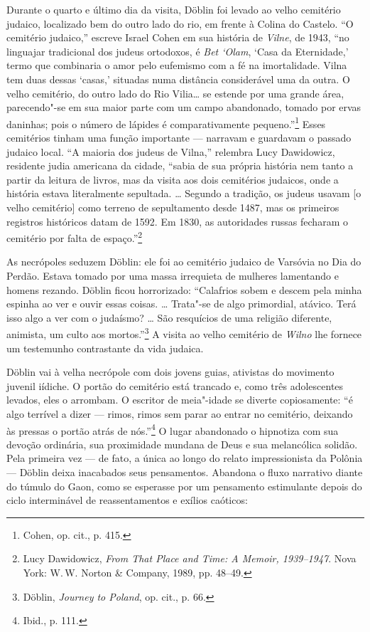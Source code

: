 Durante o quarto e último dia da visita, Döblin foi levado ao velho
cemitério judaico, localizado bem do outro lado do rio, em frente à
Colina do Castelo. ``O cemitério judaico,'' escreve Israel Cohen em sua
história de \textit{Vilne}, de 1943, ``no linguajar tradicional dos judeus
ortodoxos, é \textit{Bet `Olam}, `Casa da Eternidade,' termo que
combinaria o amor pelo eufemismo com a fé na imortalidade. Vilna tem
duas dessas `casas,' situadas numa distância considerável uma da outra.
O velho cemitério, do outro lado do Rio Vilia\ldots{} se estende por uma
grande área, parecendo"-se em sua maior parte com um campo abandonado,
tomado por ervas daninhas; pois o número de lápides é comparativamente
pequeno.''\footnote{Cohen, op. cit., p. 415.} Esses cemitérios tinham
uma função importante --- narravam e guardavam o passado judaico local.
``A maioria dos judeus de Vilna,'' relembra Lucy Dawidowicz, residente
judia americana da cidade, ``sabia de sua própria história nem tanto a
partir da leitura de livros, mas da visita aos dois cemitérios judaicos,
onde a história estava literalmente sepultada. \ldots{} Segundo a
tradição, os judeus usavam {[}o velho cemitério{]} como terreno de
sepultamento desde 1487, mas os primeiros registros históricos datam de
1592. Em 1830, as autoridades russas fecharam o cemitério por falta de
espaço.''\footnote{Lucy Dawidowicz, \textit{From That Place and Time: A Memoir, 1939--1947}. Nova York: W.\,W. Norton \& Company, 1989, pp. 48--49.}

As necrópoles seduzem Döblin: ele foi ao cemitério judaico de Varsóvia
no Dia do Perdão. Estava tomado por uma massa irrequieta de mulheres
lamentando e homens rezando. Döblin ficou horrorizado: ``Calafrios sobem
e descem pela minha espinha ao ver e ouvir essas coisas. \ldots{}
Trata"-se de algo primordial, atávico. Terá isso algo a ver com o
judaísmo? \ldots{} São resquícios de uma religião diferente, animista,
um culto aos mortos.''\footnote{Döblin, \textit{Journey to Poland}, op. cit., p. 66.} A visita ao velho cemitério de \textit{Wilno} lhe fornece um testemunho contrastante da vida judaica.

Döblin vai à velha necrópole com dois jovens guias, ativistas do
movimento juvenil iídiche. O portão do cemitério está trancado e, como
três adolescentes levados, eles o arrombam. O escritor de meia"-idade se
diverte copiosamente: ``é algo terrível a dizer --- rimos, rimos sem parar
ao entrar no cemitério, deixando às pressas o portão atrás de
nós.''\footnote{Ibid., p. 111.} O lugar abandonado o hipnotiza com sua
devoção ordinária, sua proximidade mundana de Deus e sua melancólica
solidão. Pela primeira vez --- de fato, a única ao longo do relato
impressionista da Polônia --- Döblin deixa inacabados seus pensamentos.
Abandona o fluxo narrativo diante do túmulo do Gaon, como se esperasse
por um pensamento estimulante depois do ciclo interminável de
reassentamentos e exílios caóticos:


